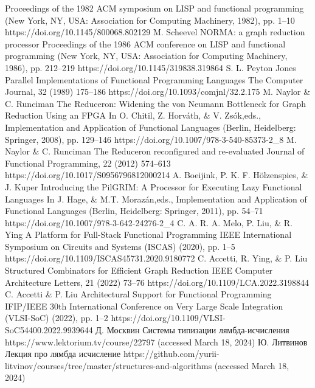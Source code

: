 \begin{frame}[allowframebreaks]
\begin{thebibliography}{}
        Proceedings of the 1982 ACM symposium on LISP and functional programming (New York, NY, USA: Association for Computing Machinery, 1982), pp. 1–10 \newblock https://doi.org/10.1145/800068.802129
        M. Scheevel \newblock
        NORMA: a graph reduction processor \newblock
        Proceedings of the 1986 ACM conference on LISP and functional programming (New York, NY, USA: Association for Computing Machinery, 1986), pp. 212–219 \newblock
        https://doi.org/10.1145/319838.319864
        S. L. Peyton Jones \newblock
        Parallel Implementations of Functional Programming Languages \newblock
        The Computer Journal, 32 (1989) 175–186 \newblock
        https://doi.org/10.1093/comjnl/32.2.175
        M. Naylor \& C. Runciman \newblock
        The Reduceron: Widening the von Neumann Bottleneck for Graph Reduction Using an FPGA \newblock
        In O. Chitil, Z. Horváth, \& V. Zsók,eds., Implementation and Application of Functional Languages (Berlin, Heidelberg: Springer, 2008), pp. 129–146 \newblock
        https://doi.org/10.1007/978-3-540-85373-2\_8
        M. Naylor \& C. Runciman \newblock
        The Reduceron reconfigured and re-evaluated \newblock
        Journal of Functional Programming, 22 (2012) 574–613 \newblock
        https://doi.org/10.1017/S0956796812000214
        A. Boeijink, P. K. F. Hölzenspies, \& J. Kuper \newblock
        Introducing the PilGRIM: A Processor for Executing Lazy Functional Languages \newblock
        In J. Hage, \& M.T. Morazán,eds., Implementation and Application of Functional Languages (Berlin, Heidelberg: Springer, 2011), pp. 54–71 \newblock
        https://doi.org/10.1007/978-3-642-24276-2\_4
        C. A. R. A. Melo, P. Liu, \& R. Ying \newblock
        A Platform for Full-Stack Functional Programming  IEEE International Symposium on Circuits and Systems (ISCAS) (2020), pp. 1–5 \newblock
        https://doi.org/10.1109/ISCAS45731.2020.9180772
        C. Accetti, R. Ying, \& P. Liu \newblock
        Structured Combinators for Efficient Graph Reduction \newblock
        IEEE Computer Architecture Letters, 21 (2022) 73–76 \newblock
        https://doi.org/10.1109/LCA.2022.3198844
        C. Accetti \& P. Liu \newblock
        Architectural Support for Functional Programming  IFIP/IEEE 30th International Conference on Very Large Scale Integration (VLSI-SoC) (2022), pp. 1–2 \newblock
        https://doi.org/10.1109/VLSI-SoC54400.2022.9939644
        Д. Москвин \newblock
        Системы типизации лямбда-исчисления \newblock
        https://www.lektorium.tv/course/22797 (accessed March 18, 2024)
        Ю. Литвинов \newblock
        Лекция про лямбда исчисление \newblock
        https://github.com/yurii-litvinov/courses/tree/master/structures-and-algorithms (accessed March 18, 2024)
    \end{thebibliography}
\end{frame}


